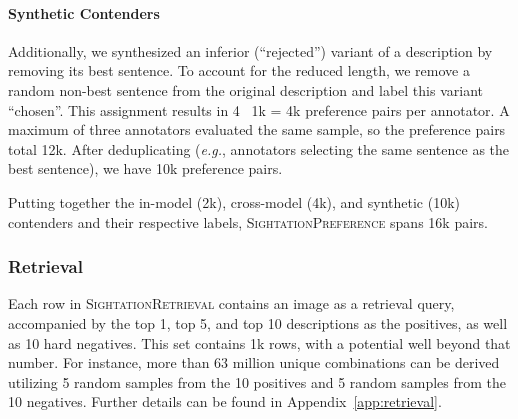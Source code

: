 \paragraph{Synthetic Contenders}
Additionally, we synthesized an inferior (``rejected'') variant of a description by removing its best sentence. To account for the reduced length, we remove a random non-best sentence from the original description and label this variant ``chosen''. This assignment results in 4 \texttimes~1k = 4k preference pairs per annotator. A maximum of three annotators evaluated the same sample, so the preference pairs total 12k. After deduplicating (\textit{e.g.}, annotators selecting the same sentence as the best sentence), we have 10k preference pairs.

Putting together the in-model (2k), cross-model (4k), and synthetic (10k) contenders and their respective labels, \textsc{SightationPreference} spans 16k pairs.

\subsubsection{Retrieval}         %

Each row in \textsc{SightationRetrieval} contains an image as a retrieval query, accompanied by the top 1, top 5, and top 10 descriptions as the positives, as well as 10 hard negatives. This set contains 1k rows, with a potential well beyond that number. For instance, more than 63 million unique combinations can be derived utilizing 5 random samples from the 10 positives and 5 random samples from the 10 negatives. Further details can be found in Appendix~\ref{app:retrieval}. 
